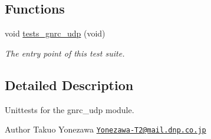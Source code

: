 \subsection*{Functions}
\begin{DoxyCompactItemize}
\item 
void \hyperlink{group__unittests_ga38d5edd024a05f621dcf3a505249ab59}{tests\+\_\+gnrc\+\_\+udp} (void)
\begin{DoxyCompactList}\small\item\em The entry point of this test suite. \end{DoxyCompactList}\end{DoxyCompactItemize}


\subsection{Detailed Description}
Unittests for the {\ttfamily gnrc\+\_\+udp} module. 

\begin{DoxyAuthor}{Author}
Takuo Yonezawa \href{mailto:Yonezawa-T2@mail.dnp.co.jp}{\tt Yonezawa-\/\+T2@mail.\+dnp.\+co.\+jp} 
\end{DoxyAuthor}
